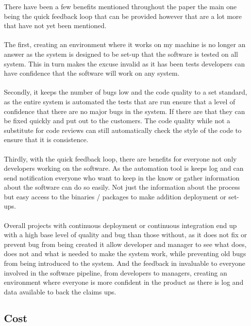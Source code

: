 There have been a few benefits mentioned throughout the paper the main one being the quick feedback loop that can be provided however that are a lot more that have not yet been mentioned.
\\\\
The first, creating an environment where it works on my machine is no longer an answer as the system is designed to be set-up that the software is tested on all system. This in turn makes the excuse invalid as it has been tests developers can have confidence that the software will work on any system.
\\\\
Secondly, it keeps the number of bugs low and the code quality to a set standard,  as the entire system is automated the tests that are run ensure that a level of confidence that there are no major bugs in the system. If there are that they can be fixed quickly and put out to the customers. The code quality while not a substitute for code reviews can still automatically check the style of the code to ensure that it is consistence. 
\\\\
Thirdly, with the quick feedback loop, there are benefits for everyone not only developers working on the software. As the automation tool is keeps log and can send notification everyone who want to keep in the know or gather information about the software can do so easily. Not just the information about the process but easy access to the binaries / packages to make addition deployment or set-ups.
\\\\
Overall projects with continuous deployment or continuous integration end up with a high base level of quality and bug than those without, as it does not fix or prevent bug from being created it allow developer and manager to see what does, does not and what is needed to make the system work, while preventing old bugs from being introduced to the system. And the feedback in invaluable to everyone involved in the software pipeline, from developers to managers, creating an environment where everyone is more confident in the product as there is log and data available to back the claims ups.


\subsection{Cost}

